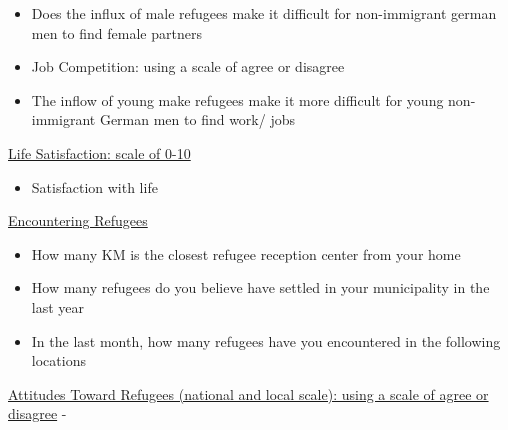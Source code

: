 \documentclass[
]{article}
\providecommand{\tightlist}{%
  \setlength{\itemsep}{0pt}\setlength{\parskip}{0pt}}\usepackage{longtable,booktabs,array}
\begin{document}
\begin{itemize}
\tightlist
\item
  Does the influx of male refugees make it difficult for non-immigrant
  german men to find female partners
\item
  Job Competition: using a scale of agree or disagree
\item
  The inflow of young make refugees make it more difficult for young
  non-immigrant German men to find work/ jobs
\end{itemize}

\uline{Life Satisfaction: scale of 0-10}

\begin{itemize}
\tightlist
\item
  Satisfaction with life
\end{itemize}

\uline{Encountering Refugees}

\begin{itemize}
\item
  How many KM is the closest refugee reception center from your home
\item
  How many refugees do you believe have settled in your municipality in
  the last year
\item
  In the last month, how many refugees have you encountered in the
  following locations
\end{itemize}

\uline{Attitudes Toward Refugees (national and local scale): using a
scale of agree or disagree} -
\end{document}
